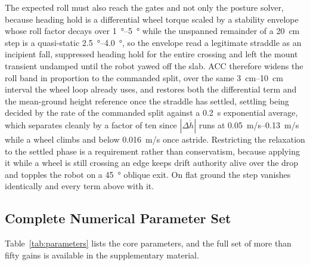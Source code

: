 \documentclass[a4paper,fleqn]{cas-dc}
\begin{document}
The expected roll must also reach the gates and not only the posture solver,
because heading hold is a differential wheel torque scaled by a stability
envelope whose roll factor decays over \SIrange{1}{5}{\degree} while the
unspanned remainder of a \SI{20}{cm} step is a quasi-static
\SIrange{2.5}{4.0}{\degree}, so the envelope read a legitimate straddle as an
incipient fall, suppressed heading hold for the entire crossing and left the
mount transient undamped until the robot yawed off the slab. ACC therefore widens
the roll band in proportion to the commanded split, over the same
\SIrange{3}{10}{cm} interval the wheel loop already uses, and restores both the
differential term and the mean-ground height reference once the straddle has
settled, settling being decided by the rate of the commanded split against a
\SI{0.2}{s} exponential average, which separates cleanly by a factor of ten since
$|\Delta \dot h|$ runs at \SIrange{0.05}{0.13}{m/s} while a wheel climbs and
below \SI{0.016}{m/s} once astride. Restricting the relaxation to the settled
phase is a requirement rather than conservatism, because applying it while a
wheel is still crossing an edge keeps drift authority alive over the drop and
topples the robot on a \SI{45}{\degree} oblique exit. On flat ground the step
vanishes identically and every term above with it.

\subsection{Complete Numerical Parameter Set}
\label{sec:parameters}

Table~\ref{tab:parameters} lists the core parameters, and the full set of more
than fifty gains is available in the supplementary material.
\end{document}
